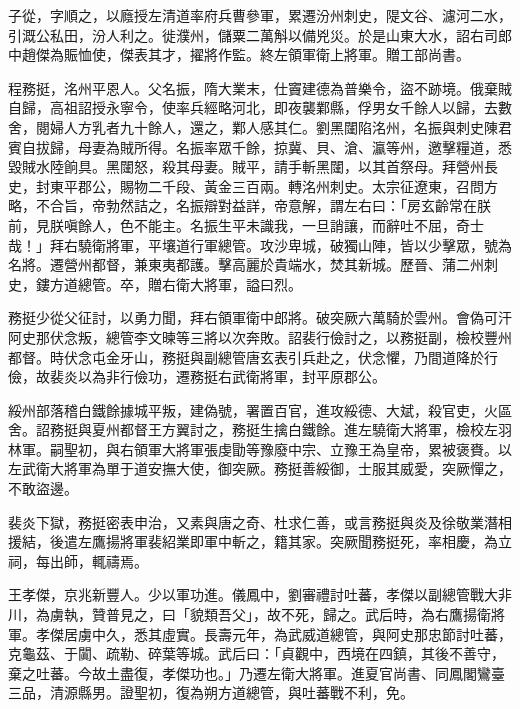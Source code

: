 \begin{pinyinscope}
 子從，字順之，以廕授左清道率府兵曹參軍，累遷汾州刺史，隄文谷、濾河二水，引溉公私田，汾人利之。徙濮州，儲粟二萬斛以備兇災。於是山東大水，詔右司郎中趙傑為賑恤使，傑表其才，擢將作監。終左領軍衛上將軍。贈工部尚書。



 程務挺，洺州平恩人。父名振，隋大業末，仕竇建德為普樂令，盜不跡境。俄棄賊自歸，高祖詔授永寧令，使率兵經略河北，即夜襲鄴縣，俘男女千餘人以歸，去數舍，閱婦人方乳者九十餘人，還之，鄴人感其仁。劉黑闥陷洺州，名振與刺史陳君賓自拔歸，母妻為賊所得。名振率眾千餘，掠冀、貝、滄、瀛等州，邀擊糧道，悉毀賊水陸餉具。黑闥怒，殺其母妻。賊平，請手斬黑闥，以其首祭母。拜營州長史，封東平郡公，賜物二千段、黃金三百兩。轉洺州刺史。太宗征遼東，召問方略，不合旨，帝勃然詰之，名振辯對益詳，帝意解，謂左右曰：「房玄齡常在朕前，見朕嗔餘人，色不能主。名振生平未識我，一旦誚讓，而辭吐不屈，奇士哉！」拜右驍衛將軍，平壤道行軍總管。攻沙卑城，破獨山陣，皆以少擊眾，號為名將。遷營州都督，兼東夷都護。擊高麗於貴端水，焚其新城。歷晉、蒲二州刺史，鏤方道總管。卒，贈右衛大將軍，謚曰烈。



 務挺少從父征討，以勇力聞，拜右領軍衛中郎將。破突厥六萬騎於雲州。會偽可汗阿史那伏念叛，總管李文暕等三將以次奔敗。詔裴行儉討之，以務挺副，檢校豐州都督。時伏念屯金牙山，務挺與副總管唐玄表引兵赴之，伏念懼，乃間道降於行儉，故裴炎以為非行儉功，遷務挺右武衛將軍，封平原郡公。



 綏州部落稽白鐵餘據城平叛，建偽號，署置百官，進攻綏德、大斌，殺官吏，火區舍。詔務挺與夏州都督王方翼討之，務挺生擒白鐵餘。進左驍衛大將軍，檢校左羽林軍。嗣聖初，與右領軍大將軍張虔勖等豫廢中宗、立豫王為皇帝，累被褒賚。以左武衛大將軍為單于道安撫大使，御突厥。務挺善綏御，士服其威愛，突厥憚之，不敢盜邊。



 裴炎下獄，務挺密表申治，又素與唐之奇、杜求仁善，或言務挺與炎及徐敬業潛相援結，後遣左鷹揚將軍裴紹業即軍中斬之，籍其家。突厥聞務挺死，率相慶，為立祠，每出師，輒禱焉。



 王孝傑，京兆新豐人。少以軍功進。儀鳳中，劉審禮討吐蕃，孝傑以副總管戰大非川，為虜執，贊普見之，曰「貌類吾父」，故不死，歸之。武后時，為右鷹揚衛將軍。孝傑居虜中久，悉其虛實。長壽元年，為武威道總管，與阿史那忠節討吐蕃，克龜茲、于闐、疏勒、碎葉等城。武后曰：「貞觀中，西境在四鎮，其後不善守，棄之吐蕃。今故土盡復，孝傑功也。」乃遷左衛大將軍。進夏官尚書、同鳳閣鸞臺三品，清源縣男。證聖初，復為朔方道總管，與吐蕃戰不利，免。




\end{pinyinscope}
